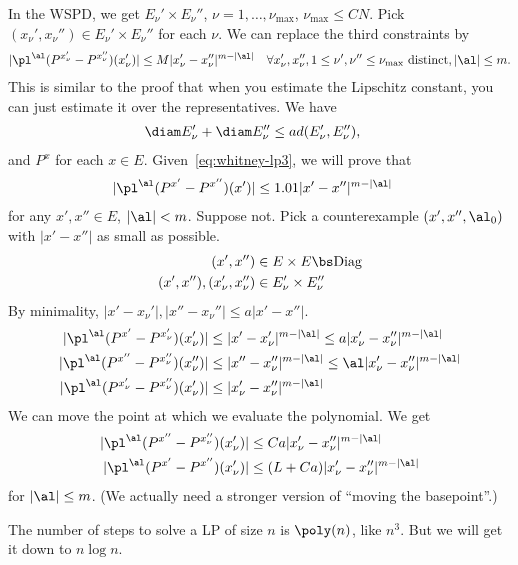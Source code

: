 In the WSPD, we get $E_\nu' \times E_\nu''$, $\nu=1,\ldots, \nu_{\max}$, $\nu_{\max}\le CN$. Pick $(x_\nu',x_\nu'')\in E_\nu' \times E_\nu''$ for each $\nu$. 
We can replace the third constraints by
\begin{align}\label{eq:whitney-lp3}
|\pl^\al (P^{x_\nu'} - P^{x_\nu''})(x_\nu')| &\le M|x_\nu'-x_\nu''|^{m-|\al|} &\forall x_\nu',x_\nu'', 1\le \nu',\nu''\le \nu_{\max} \text{ distinct}, |\al|\le m.
\end{align}
This is similar to the proof that when you estimate the Lipschitz constant, you can just estimate it over the representatives.
We have 
\begin{align}
\diam E_\nu' + \diam E_\nu'' &\le ad(E_\nu' ,E_\nu'') ,
\end{align}
and $P^x$ for each $x\in E$. Given~\eqref{eq:whitney-lp3}, we will prove that
\begin{align}
|\pl^\al (P^{x'}-P^{x''})(x')| &\le 1.01|x'-x''|^{m-|\al|}
\end{align}
for any $x',x''\in E$, $|\al|< m$.  %
Suppose not. Pick a counterexample $(x',x'',\al_0)$ with $|x'-x''|$ as small as possible.
\begin{align}
(x',x'')&\in E\times E\bs \text{Diag}\\
(x',x''), (x_\nu',x_\nu'') &\in E_\nu' \times E_\nu''
\end{align}
By minimality, $|x'-x_\nu'|,|x''-x_\nu''|\le a|x'-x''|$. 
\begin{align}
|\pl^\al(P^{x'} - P^{x_\nu'})(x_\nu')|
&\le |x'-x_\nu'|^{m-|\al|}\le a |x_\nu'-x_\nu''|^{m-|\al|}\\
|\pl^\al(P^{x''} - P^{x_\nu''})(x_\nu'')|
&\le |x''-x_\nu''|^{m-|\al|}\le \al |x_\nu'-x_\nu''|^{m-|\al|}\\
|\pl^\al(P^{x_\nu'} - P^{x_\nu''})(x_\nu')|
&\le |x_\nu'-x_\nu''|^{m-|\al|}
\end{align}
We can move the point at which we evaluate the polynomial.  We get 
\begin{align}
|\pl^\al(P^{x''} - P^{x_\nu''})(x_\nu')|
&\le Ca |x_\nu'-x_\nu''|^{m-|\al|}\\
|\pl^\al(P^{x'} - P^{x''})(x_\nu')|
&\le (L+Ca) |x_\nu'-x_\nu''|^{m-|\al|}
\end{align}
for $|\al|\le m$. (We actually need a stronger version of ``moving the basepoint''.)


The number of steps to solve a LP of size $n$ is $\poly(n)$, like $n^3$. But we will get it down to $n\log n$.

